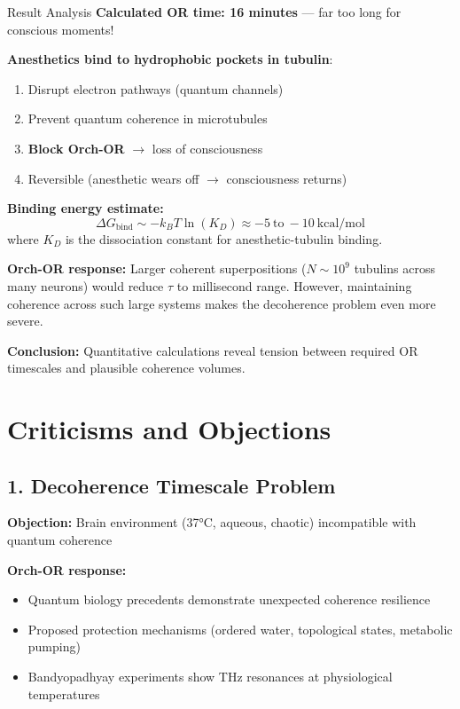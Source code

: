 \begin{calloutbox}[colback=blue!5!white,colframe=blue!75!black]{Result Analysis}
\textbf{Calculated OR time: 16 minutes} --- far too long for conscious moments!

\textbf{Anesthetics bind to hydrophobic pockets in tubulin}:
\begin{enumerate}
\item Disrupt electron pathways (quantum channels)
\item Prevent quantum coherence in microtubules
\item \textbf{Block Orch-OR} $\rightarrow$ loss of consciousness
\item Reversible (anesthetic wears off $\rightarrow$ consciousness returns)
\end{enumerate}

\textbf{Binding energy estimate:}
\begin{equation}
\label{eq:anesthetic-binding}
\Delta G_{\text{bind}} \sim -k_B T \ln(K_D) \approx -5~\text{to}~-10~\text{kcal/mol}
\end{equation}
where $K_D$ is the dissociation constant for anesthetic-tubulin binding.

\textbf{Orch-OR response:} Larger coherent superpositions ($N \sim 10^9$ tubulins across many neurons) would reduce $\tau$ to millisecond range. However, maintaining coherence across such large systems makes the decoherence problem even more severe.

\textbf{Conclusion:} Quantitative calculations reveal tension between required OR timescales and plausible coherence volumes.
\end{calloutbox}

\section{Criticisms and Objections}

\subsection{1. Decoherence Timescale Problem}

\textbf{Objection:} Brain environment (37°C, aqueous, chaotic) incompatible with quantum coherence

\textbf{Orch-OR response:}
\begin{itemize}
\item Quantum biology precedents demonstrate unexpected coherence resilience
\item Proposed protection mechanisms (ordered water, topological states, metabolic pumping)
\item Bandyopadhyay experiments show THz resonances at physiological temperatures
\end{itemize}

